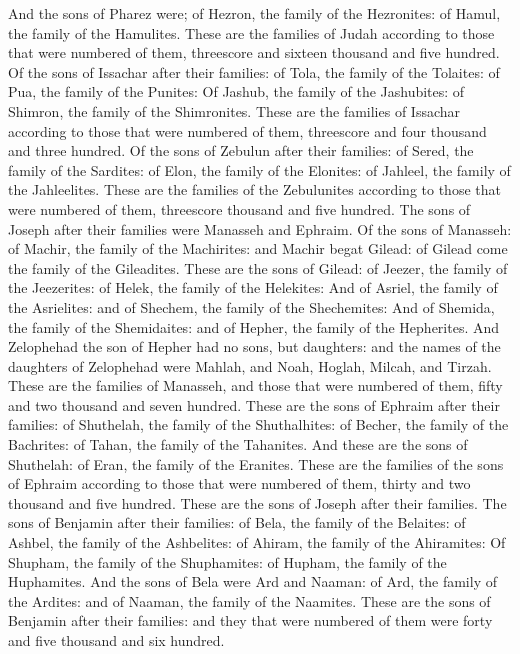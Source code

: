 \begin{biblechapter}
\verse And the sons of Pharez were; of Hezron, the family of the Hezronites: of Hamul, the family of the Hamulites.
\verse These are the families of Judah according to those that were numbered of them, threescore and sixteen thousand and five hundred.
\verse Of the sons of Issachar after their families: of Tola, the family of the Tolaites: of Pua, the family of the Punites:
\verse Of Jashub, the family of the Jashubites: of Shimron, the family of the Shimronites.
\verse These are the families of Issachar according to those that were numbered of them, threescore and four thousand and three hundred.
\verse Of the sons of Zebulun after their families: of Sered, the family of the Sardites: of Elon, the family of the Elonites: of Jahleel, the family of the Jahleelites.
\verse These are the families of the Zebulunites according to those that were numbered of them, threescore thousand and five hundred.
\verse The sons of Joseph after their families were Manasseh and Ephraim.
\verse Of the sons of Manasseh: of Machir, the family of the Machirites: and Machir begat Gilead: of Gilead come the family of the Gileadites.
\verse These are the sons of Gilead: of Jeezer, the family of the Jeezerites: of Helek, the family of the Helekites:
\verse And of Asriel, the family of the Asrielites: and of Shechem, the family of the Shechemites:
\verse And of Shemida, the family of the Shemidaites: and of Hepher, the family of the Hepherites.
\verse And Zelophehad the son of Hepher had no sons, but daughters: and the names of the daughters of Zelophehad were Mahlah, and Noah, Hoglah, Milcah, and Tirzah.
\verse These are the families of Manasseh, and those that were numbered of them, fifty and two thousand and seven hundred.
\verse These are the sons of Ephraim after their families: of Shuthelah, the family of the Shuthalhites: of Becher, the family of the Bachrites: of Tahan, the family of the Tahanites.
\verse And these are the sons of Shuthelah: of Eran, the family of the Eranites.
\verse These are the families of the sons of Ephraim according to those that were numbered of them, thirty and two thousand and five hundred. These are the sons of Joseph after their families.
\verse The sons of Benjamin after their families: of Bela, the family of the Belaites: of Ashbel, the family of the Ashbelites: of Ahiram, the family of the Ahiramites:
\verse Of Shupham, the family of the Shuphamites: of Hupham, the family of the Huphamites.
\verse And the sons of Bela were Ard and Naaman: of Ard, the family of the Ardites: and of Naaman, the family of the Naamites.
\verse These are the sons of Benjamin after their families: and they that were numbered of them were forty and five thousand and six hundred.

\end{biblechapter}
